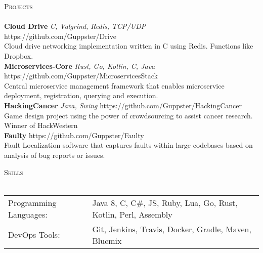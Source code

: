 \documentclass[a4paper]{article}
\newcommand{\lineunder} {
    \vspace*{-8pt} \\
    \hspace*{-18pt} \hrulefill \\
}
\newcommand{\header} [1] {
    {\hspace*{-18pt}\vspace*{6pt} \textsc{#1}}
    \vspace*{-6pt} \lineunder
}
\begin{document}
\header{Projects}
{\textbf{Cloud Drive} \sl C, Valgrind, Redis, TCP/UDP} \hfill https://github.com/Guppster/Drive\\
\vspace*{1mm}
Cloud drive networking implementation written in C using Redis. Functions like Dropbox.\\
\vspace*{2mm}
{\textbf{Microservices-Core} \sl Rust, Go, Kotlin, C, Java} \hfill https://github.com/Guppster/MicroservicesStack\\
\vspace*{1mm}
Central microservice management framework that enables microservice deployment, registration, querying and execution.\\
\vspace*{2mm}
{\textbf{HackingCancer} \sl Java, Swing} \hfill https://github.com/Guppster/HackingCancer\\
\vspace*{1mm}
Game design project using the power of crowdsourcing to assist cancer research. Winner of HackWestern\\
\vspace*{2mm}
{\textbf{Faulty} \sl } \hfill https://github.com/Guppster/Faulty\\
\vspace*{1mm}
Fault Localization software that captures faults within large codebases based on analysis of bug reports or issues.\\
\vspace*{2mm}

\header{Skills}
\begin{tabular}{ l l }
	Programming Languages: & Java 8, C, C\#, JS, Ruby, Lua, Go, Rust, Kotlin, Perl, Assembly \\
	DevOps Tools:          & Git, Jenkins, Travis, Docker, Gradle, Maven, Bluemix \\
\end{tabular}
\end{document}

